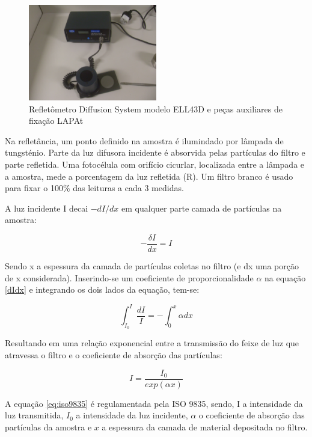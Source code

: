 \begin{figure}[H]
  \centering
  \includegraphics[width=0.5\textwidth]{../inputs/images/refletometro.jpg}
  \caption{Refletômetro Diffusion System modelo ELL43D 
           e peças auxiliares de fixação LAPAt}
\end{figure}

Na refletância, um ponto definido na amostra é ilumindado por lâmpada de 
tungsténio. Parte da luz difusora incidente é absorvida pelas partículas
do filtro e parte refletida. Uma fotocélula com orifício cicurlar, localizada
entre a lâmpada e a amostra, mede a porcentagem da luz refletida (R).
Um filtro branco é usado para fixar o 100\% das leituras a cada 3 medidas.

A luz incidente I decai $-dI/dx$ em qualquer parte camada de partículas na 
amostra:

\begin{equation}
  \label{eq:dIdx}
  -\frac{\delta I}{dx} = I
\end{equation}

Sendo x a espessura da camada de partículas coletas no filtro (e dx uma porção
de x considerada). 
Inserindo-se um coeficiente de proporcionalidade $\alpha$ na equação \ref{dIdx}
e integrando os dois lados da equação, tem-se:

\begin{equation}
  \int_{I_0}^{I} \frac{dI}{I} = - \int_{0}^{x} \alpha dx
\end{equation}

Resultando em uma relação exponencial entre a transmissão do feixe de luz 
que atravessa o filtro e o coeficiente de absorção das partículas:

\begin{equation}
  \label{eq:iso9835}
  I = \frac{I_0}{exp(\alpha x)}
\end{equation}

A equação \ref{eq:iso9835} é regulamentada pela ISO 9835, sendo, I a intensidade 
da luz transmitida, $I_0$ a intensidade da luz incidente, $\alpha$ o coeficiente
de absorção das partículas da amostra e $x$ a espessura da camada de material
depositada no filtro. 

